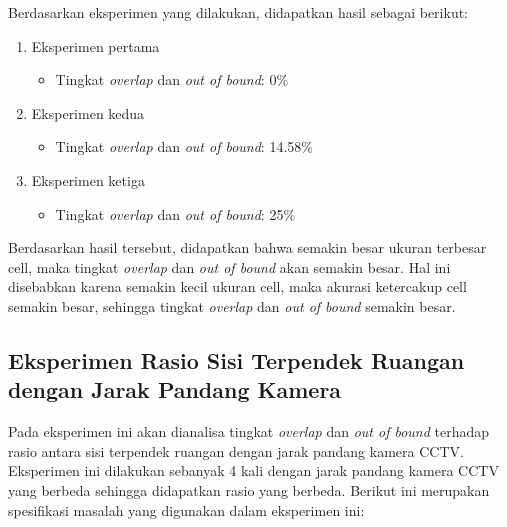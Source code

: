 Berdasarkan eksperimen yang dilakukan, didapatkan hasil sebagai berikut:
\begin{enumerate}
	\item Eksperimen pertama
	\begin{itemize}
		\item Tingkat \textit{overlap} dan \textit{out of bound}: 0\%
	\end{itemize}
	
	\item Eksperimen kedua
	\begin{itemize}
		\item Tingkat \textit{overlap} dan \textit{out of bound}: 14.58\%
	\end{itemize}
	
	\item Eksperimen ketiga
	\begin{itemize}
		\item Tingkat \textit{overlap} dan \textit{out of bound}: 25\%
	\end{itemize}
\end{enumerate}
	
Berdasarkan hasil tersebut, didapatkan bahwa semakin besar ukuran terbesar cell, maka tingkat \textit{overlap} dan \textit{out of bound} akan semakin besar. Hal ini disebabkan karena semakin kecil ukuran cell, maka akurasi ketercakup cell semakin besar, sehingga tingkat \textit{overlap} dan \textit{out of bound} semakin besar.

\subsection{Eksperimen Rasio Sisi Terpendek Ruangan dengan Jarak Pandang Kamera}
Pada eksperimen ini akan dianalisa tingkat \textit{overlap} dan \textit{out of bound} terhadap rasio antara sisi terpendek ruangan dengan jarak pandang kamera CCTV. Eksperimen ini dilakukan sebanyak 4 kali dengan jarak pandang kamera CCTV yang berbeda sehingga didapatkan rasio yang berbeda. Berikut ini merupakan spesifikasi masalah yang digunakan dalam eksperimen ini:

